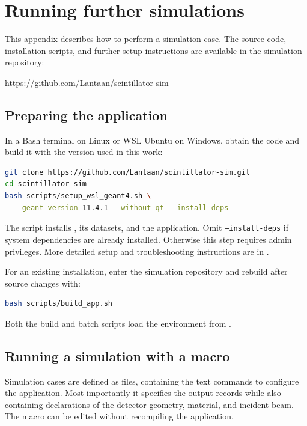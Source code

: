 
\chapter{Running further simulations}
\label{app:running-simulations}
\lstset{basicstyle=\ttfamily\footnotesize,columns=fullflexible,
  keepspaces=true,showstringspaces=false}

This appendix describes how to perform a simulation case. The source code, installation scripts, and further setup instructions are available in the simulation repository:
\begin{center}
  \url{https://github.com/Lantaan/scintillator-sim}
\end{center}

\section{Preparing the application}

In a Bash terminal on Linux or WSL Ubuntu on Windows, obtain the code and build it with the \geantfour{} version used in this work:
\begin{lstlisting}[language=bash,numbers=none]
git clone https://github.com/Lantaan/scintillator-sim.git
cd scintillator-sim
bash scripts/setup_wsl_geant4.sh \
  --geant-version 11.4.1 --without-qt --install-deps
\end{lstlisting}
The script installs \geantfour{}, its datasets, and the application. Omit \texttt{--install-deps} if system dependencies are already installed. Otherwise this step requires admin privileges. More detailed setup and troubleshooting instructions are in .

For an existing installation, enter the simulation repository and rebuild after source changes with:
\begin{lstlisting}[language=bash,numbers=none]
bash scripts/build_app.sh
\end{lstlisting}
Both the build and batch scripts load the \geantfour{} environment from .

\section{Running a simulation with a macro}

Simulation cases are defined as  files, containing the text commands to configure the application. Most importantly it specifies the output records while also containing declarations of the detector geometry, material, and incident beam. The macro can be edited without recompiling the application.

